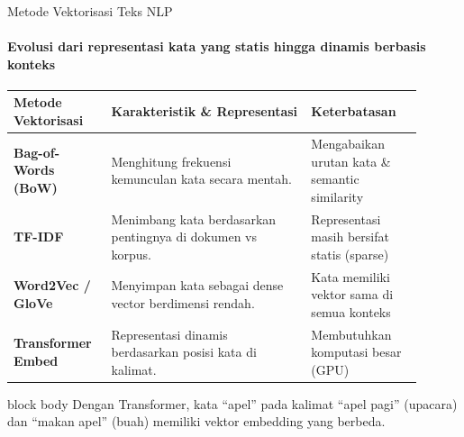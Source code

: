 \documentclass[aspectratio=169,t]{beamer}
\newcommand{\takeaway}[1]{%
  \vspace{0.1em}
  \begin{beamercolorbox}[rounded=true,shadow=false,sep=5pt]{block body}
    \centering\footnotesize\color{nvlightgreen}#1
  \end{beamercolorbox}%
}
\begin{document}
\begin{frame}{Metode Vektorisasi Teks NLP}
  \framesubtitle{Evolusi dari representasi kata yang statis hingga dinamis berbasis konteks}
  \begin{center}
  \renewcommand{\arraystretch}{1.2}{\footnotesize\setlength{\tabcolsep}{8pt}
  \begin{tabular}{@{}p{0.20\linewidth}p{0.45\linewidth}p{0.25\linewidth}@{}}
    \toprule \rowcolor{nvcard!50}
    \textbf{Metode Vektorisasi} & \textbf{Karakteristik \& Representasi} & \textbf{Keterbatasan} \\ \midrule
    \textbf{Bag-of-Words (BoW)} & Menghitung frekuensi kemunculan kata secara mentah. & Mengabaikan urutan kata \& semantic similarity \\
    \textbf{TF-IDF} & Menimbang kata berdasarkan pentingnya di dokumen vs korpus. & Representasi masih bersifat statis (sparse) \\
    \textbf{Word2Vec / GloVe} & Menyimpan kata sebagai dense vector berdimensi rendah. & Kata memiliki vektor sama di semua konteks \\
    \textbf{Transformer Embed} & Representasi dinamis berdasarkan posisi kata di kalimat. & Membutuhkan komputasi besar (GPU) \\
    \bottomrule
  \end{tabular}}
  \end{center}
  \takeaway{Dengan Transformer, kata ``apel'' pada kalimat ``apel pagi'' (upacara) dan ``makan apel'' (buah) memiliki vektor embedding yang berbeda.}
\end{frame}
\end{document}
